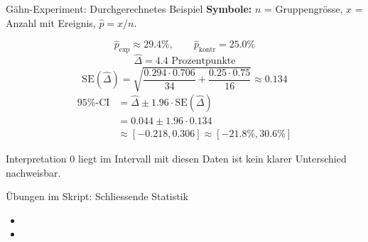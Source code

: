 \begin{frame}{Gähn-Experiment: Durchgerechnetes Beispiel}
    \small
    \textbf{Symbole:} $n$ = Gruppengrösse, $x$ = Anzahl mit Ereignis, $\hat{p}=x/n$.

    \vspace{0.4em}
    \[
        \hat{p}_{\mathrm{exp}}\approx29.4\%,
        \qquad
        \hat{p}_{\mathrm{kontr}}=25.0\%
    \]
    \[
        \hat{\Delta}=4.4\text{ Prozentpunkte}
    \]
    \[
        \mathrm{SE}(\hat{\Delta})
        =\sqrt{\frac{0.294\cdot0.706}{34}+\frac{0.25\cdot0.75}{16}}
        \approx0.134
    \]
    \[
        \begin{aligned}
            95\%\text{-CI} & = \hat{\Delta}\pm1.96\cdot\mathrm{SE}(\hat{\Delta}) \\
                           & = 0.044\pm1.96\cdot0.134                            \\
                           & \approx [-0.218,0.306] \approx [-21.8\%,30.6\%]
        \end{aligned}
    \]
    \begin{block}{Interpretation}
        0 liegt im Intervall \Rightarrow mit diesen Daten ist kein klarer Unterschied nachweisbar.
    \end{block}
\end{frame}


\begin{frame}{Übungen im Skript: Schliessende Statistik}
    \begin{itemize}
        \item {}
        \item {}
    \end{itemize}
\end{frame}

